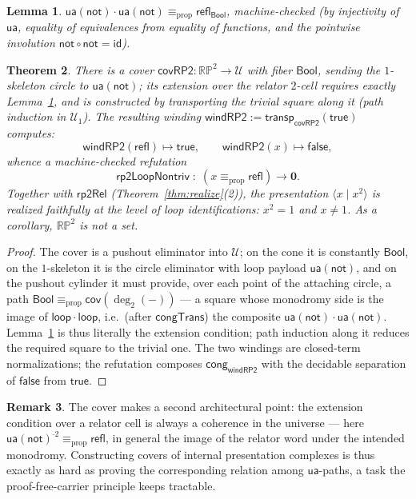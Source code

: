 \documentclass[11pt]{amsart}
\newtheorem{thm}{Theorem}[section]
\newtheorem{lem}[thm]{Lemma}
\theoremstyle{definition}
\newtheorem{rem}[thm]{Remark}
\newcommand{\propeq}{\equiv_{\mathrm{prop}}}
\newcommand{\refl}{\mathsf{refl}}
\newcommand{\U}{\mathcal{U}}
\newcommand{\ua}{\mathsf{ua}}
\newcommand{\transp}{\mathsf{transp}}
\newcommand{\cng}{\mathsf{cong}}
\newcommand{\trns}{\mathbin{\cdot}}
\newcommand{\RP}{\mathbb{RP}^2}
\begin{document}
\begin{lem}
  \label{lem:uanotnot}
  $\ua(\mathsf{not}) \trns \ua(\mathsf{not}) \propeq
  \refl_{\mathsf{Bool}}$, machine-checked (by injectivity of $\ua$,
  equality of equivalences from equality of functions, and the
  pointwise involution $\mathsf{not}\circ\mathsf{not} = \mathsf{id}$).
\end{lem}

\begin{thm}
  \label{thm:cover}
  There is a cover $\mathsf{covRP2} : \RP \to \U$ with fiber
  $\mathsf{Bool}$, sending the $1$-skeleton circle to
  $\ua(\mathsf{not})$; its extension over the relator $2$-cell
  requires exactly Lemma~\ref{lem:uanotnot}, and is constructed by
  transporting the trivial square along it (path induction in
  $\U_1$).  The resulting winding
  $\mathsf{windRP2} := \transp_{\mathsf{covRP2}}(\mathsf{true})$
  computes:
  \[
    \mathsf{windRP2}(\refl) \longmapsto \mathsf{true},
    \qquad
    \mathsf{windRP2}(x) \longmapsto \mathsf{false},
  \]
  whence a machine-checked refutation
  \[
    \mathsf{rp2LoopNontriv} \;:\;
    (x \propeq \refl) \to \mathbf{0}.
  \]
  Together with $\mathsf{rp2Rel}$
  (Theorem~\ref{thm:realize}(2)), the presentation
  $\langle x \mid x^2\rangle$ is realized faithfully at the level of
  loop identifications: $x^2 = 1$ and $x \neq 1$.  As a corollary,
  $\RP$ is not a set.
\end{thm}

\begin{proof}
  The cover is a pushout eliminator into $\U$; on the cone it is
  constantly $\mathsf{Bool}$, on the $1$-skeleton it is the circle
  eliminator with loop payload $\ua(\mathsf{not})$, and on the
  pushout cylinder it must provide, over each point of the attaching
  circle, a path $\mathsf{Bool} \propeq
  \mathsf{cov}(\deg_2(-))$ --- a square whose monodromy side is the
  image of $\mathsf{loop} \trns \mathsf{loop}$, i.e.\ (after
  $\mathsf{congTrans}$) the composite
  $\ua(\mathsf{not}) \trns \ua(\mathsf{not})$.
  Lemma~\ref{lem:uanotnot} is thus literally the extension
  condition; path induction along it reduces the required square to
  the trivial one.  The two windings are closed-term
  normalizations; the refutation composes
  $\cng_{\mathsf{windRP2}}$ with the decidable separation of
  $\mathsf{false}$ from $\mathsf{true}$.
\end{proof}

\begin{rem}
  The cover makes a second architectural point: the extension
  condition over a relator cell is always a coherence in the
  universe --- here $\ua(\mathsf{not})^{\trns 2} \propeq \refl$,
  in general the image of the relator word under the intended
  monodromy.  Constructing covers of internal presentation
  complexes is thus exactly as hard as proving the corresponding
  relation among $\ua$-paths, a task the proof-free-carrier
  principle keeps tractable.
\end{rem}
\end{document}
